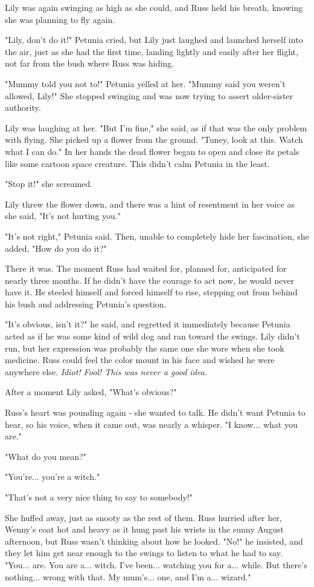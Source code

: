 \documentclass[a4paper,11pt]{article}
\begin{document}
Lily was again swinging as high as she could, and Russ held his breath, knowing she was planning to fly again.

"Lily, don't do it!" Petunia cried, but Lily just laughed and launched herself into the air, just as she had the first time, landing lightly and easily after her flight, not far from the bush where Russ was hiding.

"Mummy told you not to!" Petunia yelled at her. "Mummy said you weren't allowed, Lily!" She stopped swinging and was now trying to assert older-sister authority.

Lily was laughing at her. "But I'm fine," she said, as if that was the only problem with flying. She picked up a flower from the ground. "Tuney, look at this. Watch what I can do." In her hands the dead flower began to open and close its petals like some cartoon space creature. This didn't calm Petunia in the least.

"Stop it!" she screamed.

Lily threw the flower down, and there was a hint of resentment in her voice as she said, "It's not hurting you."

"It's not right," Petunia said. Then, unable to completely hide her fascination, she added, "How do you do it?"

There it was. The moment Russ had waited for, planned for, anticipated for nearly three months. If he didn't have the courage to act now, he would never have it. He steeled himself and forced himself to rise, stepping out from behind his bush and addressing Petunia's question.

"It's obvious, isn't it?" he said, and regretted it immediately because Petunia acted as if he was some kind of wild dog and ran toward the swings. Lily didn't run, but her expression was probably the same one she wore when she took medicine. Russ could feel the color mount in his face and wished he were anywhere else. \emph{Idiot! Fool! This was never a good idea.}

After a moment Lily asked, "What's obvious?"

Russ's heart was pounding again - she wanted to talk. He didn't want Petunia to hear, so his voice, when it came out, was nearly a whisper. "I know... what you are."

"What do you mean?"

"You're... you're a witch."

"That's not a very nice thing to say to somebody!"

She huffed away, just as snooty as the rest of them. Russ hurried after her, Wenny's coat hot and heavy as it hung past his wrists in the sunny August afternoon, but Russ wasn't thinking about how he looked. "No!" he insisted, and they let him get near enough to the swings to listen to what he had to say. "You... are. You are a... witch. I've been... watching you for a... while. But there's nothing... wrong with that. My mum's... one, and I'm a... wizard."
\end{document}
